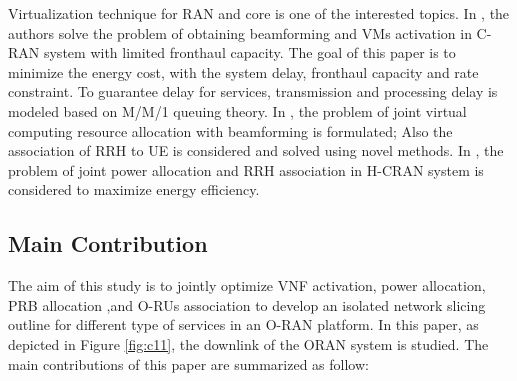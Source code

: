 \documentclass[conference]{IEEEtran}
\begin{document}
Virtualization technique for RAN and core is one of the interested topics.  
In \cite{SystemCostMinimization,guo2016exploiting}, the authors solve the problem of obtaining beamforming and VMs activation 
in C-RAN system with limited fronthaul capacity. The goal of this paper is to minimize the energy cost, with the system delay, fronthaul capacity and rate constraint. To guarantee delay for services, transmission and processing delay is modeled based on M/M/1 queuing theory. In \cite{luong2018joint,luong2018novel}, the problem of joint virtual computing resource allocation with beamforming is formulated; Also the association of RRH to UE is considered and solved using novel methods.
In \cite{ali2019energy,ali2019energy1,ali2018joint}, the problem of joint power allocation and RRH association in H-CRAN system is considered to maximize energy efficiency.
\subsection{Main Contribution}
The aim of this study is to jointly optimize VNF activation, power allocation, PRB allocation ,and O-RUs association to develop an isolated network slicing outline for different type of services in an O-RAN platform. In this paper, as  depicted in Figure \ref{fig:c11}, the downlink of the ORAN system is studied.
The main contributions of this paper are summarized as follow:
\end{document}
